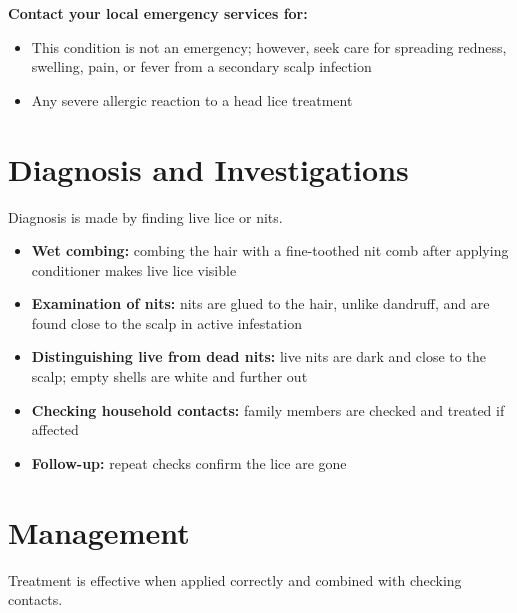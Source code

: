 \textbf{Contact your local emergency services for:}
\begin{itemize}
    \item This condition is not an emergency; however, seek care for spreading redness, swelling, pain, or fever from a secondary scalp infection
    \item Any severe allergic reaction to a head lice treatment
\end{itemize}

\section*{Diagnosis and Investigations}
Diagnosis is made by finding live lice or nits.

\begin{itemize}
    \item \textbf{Wet combing:} combing the hair with a fine-toothed nit comb after applying conditioner makes live lice visible
    \item \textbf{Examination of nits:} nits are glued to the hair, unlike dandruff, and are found close to the scalp in active infestation
    \item \textbf{Distinguishing live from dead nits:} live nits are dark and close to the scalp; empty shells are white and further out
    \item \textbf{Checking household contacts:} family members are checked and treated if affected
    \item \textbf{Follow-up:} repeat checks confirm the lice are gone
\end{itemize}

\section*{Management}
Treatment is effective when applied correctly and combined with checking contacts.

